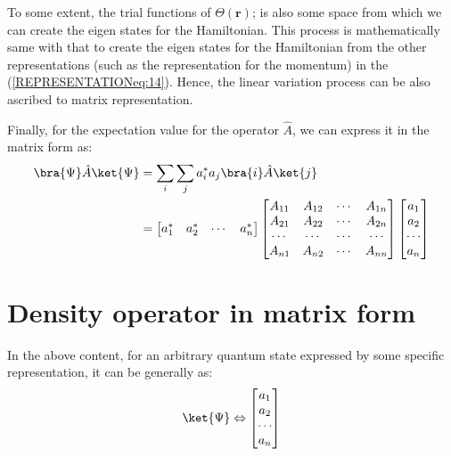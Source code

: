 To some extent, the trial functions of $\Theta(\bm{r})$; is also
some space from which we can create the eigen states for the
Hamiltonian. This process is mathematically same with that to create
the eigen states for the Hamiltonian from the other representations
(such as the representation for the momentum) in the
(\ref{REPRESENTATIONeq:14}). Hence, the linear variation process can
be also ascribed to matrix representation.

Finally, for the expectation value for the operator $\hat{A}$, we
can express it in the matrix form as:
\begin{align}\label{REPRESENTATIONeq:9}
\bra{\Psi}\hat{A}\ket{\Psi} &=
\sum_{i}\sum_{j}a^{*}_{i}a_{j}\bra{i}\hat{A}\ket{j} \nonumber
\\
&=
\begin{bmatrix}
a_{1}^{*} & a_{2}^{*} & \cdots & a_{n}^{*} \\
\end{bmatrix}
\begin{bmatrix}
     A_{11} & A_{12} & \cdots & A_{1n} \\
     A_{21} & A_{22} & \cdots & A_{2n} \\
     \cdots & \cdots & \cdots & \cdots \\
     A_{n1} & A_{n2} & \cdots & A_{nn} \\
   \end{bmatrix}
\begin{bmatrix}
  a_{1} \\
  a_{2} \\
  \cdots \\
  a_{n} \\
\end{bmatrix}
\end{align}


\section{Density operator in matrix form}
%
%
In the above content, for an arbitrary quantum state expressed by
some specific representation, it can be generally as:
\begin{equation}
\ket{\Psi} \Leftrightarrow
                           \begin{bmatrix}
                             a_{1} \\
                             a_{2} \\
                             \cdots   \\
                             a_{n} \\
                           \end{bmatrix}
\end{equation}

